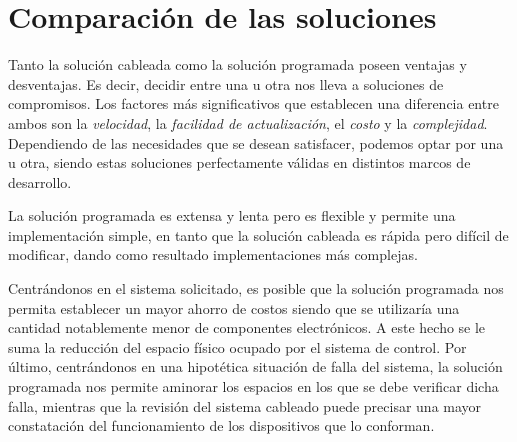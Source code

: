 \documentclass{article}
\begin{document}
\section{Comparación de las soluciones}
\medskip

	Tanto la solución cableada como la solución programada poseen ventajas y desventajas. Es decir, decidir entre una u otra nos lleva a soluciones de compromisos. Los factores más significativos que establecen una diferencia entre ambos son la \textit{velocidad}, la \textit{facilidad de actualización}, el \textit{costo} y la \textit{complejidad}. Dependiendo de las necesidades que se desean satisfacer, podemos optar por una u otra, siendo estas soluciones perfectamente válidas en distintos marcos de desarrollo.
	\par
	La solución programada es extensa y lenta pero es flexible y permite una implementación simple, en tanto que la solución cableada es rápida pero difícil de modificar, dando como resultado implementaciones más complejas. 
	\par
	Centrándonos en el sistema solicitado, es posible que la solución programada nos permita establecer un mayor ahorro de costos siendo que se utilizaría una cantidad notablemente menor de componentes electrónicos. A este hecho se le suma la reducción del espacio físico ocupado por el sistema de control. Por último, centrándonos en una hipotética situación de falla del sistema, la solución programada nos permite aminorar los espacios en los que se debe verificar dicha falla, mientras que la revisión del sistema cableado puede precisar una mayor constatación del funcionamiento de los dispositivos que lo conforman.
\end{document}
